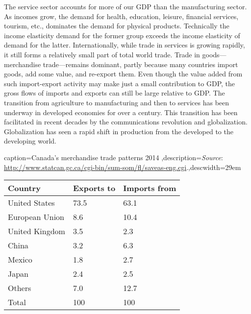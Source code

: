 The service sector accounts for more of our GDP than the manufacturing
sector. As incomes grow, the demand for health, education, leisure,
financial services, tourism, etc., dominates the demand for physical products.
Technically the income elasticity demand for the former group exceeds the
income elasticity of demand for the latter. Internationally, while trade in
services is growing rapidly, it still forms a relatively small part of total
world trade. Trade in goods---merchandise trade---remains dominant, partly
because many countries import goods, add some value, and re-export them.
Even though the value added from such import-export activity may make just
a small contribution to GDP, the gross flows of imports and exports can
still be large relative to GDP. The transition from agriculture to
manufacturing and then to services has been underway in developed economies
for over a century. This transition has been facilitated in recent decades
by the communications revolution and globalization. Globalization has seen a
rapid shift in production from the developed to the developing world.

\newhtmlpage

\begin{Table}{caption={Canada's merchandise trade patterns 2014 \label{table:cdnmerchtradepatterns}},description={\textit{Source}: \url{http://www.statcan.gc.ca/cgi-bin/sum-som/fl/saveas-eng.cgi}.},descwidth={29em}}
	\begin{tabu} to \linewidth {|X[1.75,l]X[1,c]X[1,c]|}	\hline
			\textbf{Country}	& \textbf{Exports to}	& \textbf{Imports from}	\\ \hline
		United States 			& 73.5 			& 63.1 			\\ 
			European Union 			& 8.6 			& 10.4 			\\ 
		United Kingdom 			& 3.5 			& 2.3 			\\ 
			China 					& 3.2 			& 6.3 			\\ 
		Mexico 					& 1.8 			& 2.7 			\\ 
			Japan 					& 2.4 			& 2.5 			\\ 
		Others 					& 7.0 			& 12.7 			\\ 
			Total 					& 100 			& 100			\\	\hline
	\end{tabu}
\end{Table}

